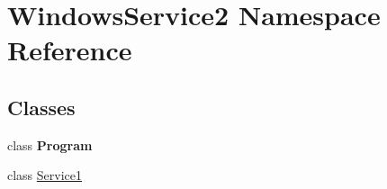 \hypertarget{namespace_windows_service2}{}\section{Windows\+Service2 Namespace Reference}
\label{namespace_windows_service2}
\subsection*{Classes}
\begin{DoxyCompactItemize}
\item 
class {\bfseries Program}
\item 
class \mbox{\hyperlink{class_windows_service2_1_1_service1}{Service1}}
\end{DoxyCompactItemize}
